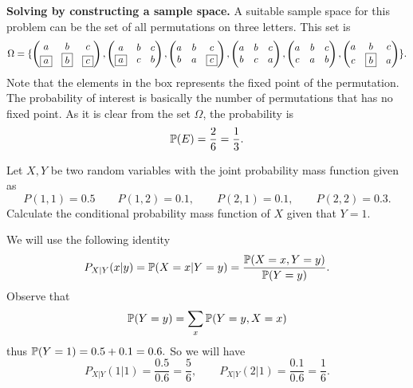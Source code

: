 \begin{solution}
	\textbf{Solving by constructing a sample space.} A suitable sample space for this problem can be the set of all permutations on three letters. This set is
	\[ \Omega = 
	\{\begin{pmatrix}
			a & b & c \\
			\boxed{a} & \boxed{b} & \boxed{c}
		\end{pmatrix},
		\begin{pmatrix}
			a & b & c \\
			\boxed{a} & c & b
		\end{pmatrix},
		\begin{pmatrix}
			a & b & c \\
			b & a & \boxed{c}
		\end{pmatrix},
		\begin{pmatrix}
			a & b & c \\
			b & c & a
		\end{pmatrix},
		\begin{pmatrix}
			a & b & c \\
			c & a & b
		\end{pmatrix},
		\begin{pmatrix}
			a & b & c \\
			c & \boxed{b} & a
	\end{pmatrix}\}.
	\]
	Note that the elements in the box represents the fixed point of the permutation. The probability of interest is basically the number of permutations that has no fixed point. As it is clear from the set $\Omega$, the probability is
	\[ \mathbb{P}(E) = \frac{2}{6} = \frac{1}{3}. \]
\end{solution}

\begin{problem}
	Let $ X,Y $ be two random variables with the joint probability mass function given as 
	\[ P(1,1) = 0.5 \qquad P(1,2)=0.1,\qquad P(2,1)=0.1, \qquad P(2,2)=0.3. \]
	Calculate the conditional probability mass function of $ X $ given that $ Y = 1 $.
\end{problem}
\begin{solution}
	We will use the following identity
	\[ P_{X|Y}(x|y) = \mathbb{P}(X=x|Y=y) = \frac{\mathbb{P}(X=x,Y=y)}{\mathbb{P}(Y=y)}. \]
	Observe that 
	\[ \mathbb{P}(Y=y) = \sum_x \mathbb{P}(Y=y,X=x) \]
	thus $ \mathbb{P}(Y=1) = 0.5 + 0.1 = 0.6. $
	So we will have
	\[ P_{X|Y}(1|1) = \frac{0.5}{0.6} = \frac{5}{6}, \qquad P_{X|Y}(2|1) = \frac{0.1}{0.6} = \frac{1}{6}. \]
\end{solution}


